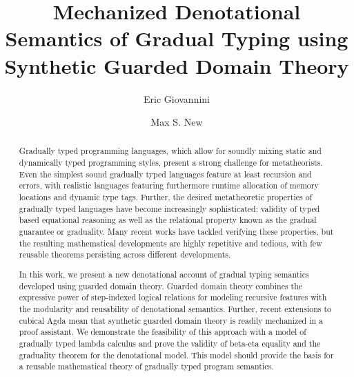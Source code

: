 \documentclass[acmsmall,screen]{acmart}
\begin{document}
\title{Mechanized Denotational Semantics of Gradual Typing using Synthetic Guarded Domain Theory}
\author{Eric Giovannini}
\author{Max S. New}

\begin{abstract}
  Gradually typed programming languages, which allow for soundly
  mixing static and dynamically typed programming styles, present a
  strong challenge for metatheorists. Even the simplest sound
  gradually typed languages feature at least recursion and errors,
  with realistic languages featuring furthermore runtime allocation of
  memory locations and dynamic type tags. Further, the desired
  metatheoretic properties of gradually typed languages have become
  increasingly sophisticated: validity of typed based equational
  reasoning as well as the relational property known as the gradual
  guarantee or graduality. Many recent works have tackled verifying
  these properties, but the resulting mathematical developments are
  highly repetitive and tedious, with few reusable theorems persisting
  across different developments.

  In this work, we present a new denotational account of gradual
  typing semantics developed using guarded domain theory. Guarded
  domain theory combines the expressive power of step-indexed logical
  relations for modeling recursive features with the modularity and
  reusability of denotational semantics. Further, recent extensions to
  cubical Agda mean that synthetic guarded domain theory is readily
  mechanized in a proof assistant. We demonstrate the feasibility of
  this approach with a model of gradually typed lambda calculus and
  prove the validity of beta-eta equality and the graduality theorem
  for the denotational model. This model should provide the basis for
  a reusable mathematical theory of gradually typed program semantics.
  
  \end{abstract}
\end{document}
